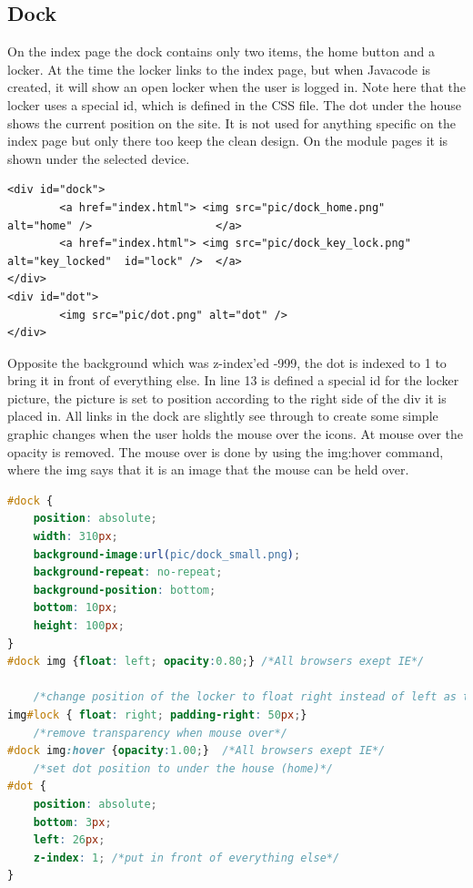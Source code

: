 \subsection{Dock}
On the index page the dock contains only two items, the home button and a locker. At the time the locker links to the index page, but when Javacode is created, it will show an open locker when the user is logged in. Note here that the locker uses a special id, which is defined in the CSS file. The dot under the house shows the current position on the site. It is not used for anything specific on the index page but only there too keep the clean design. On the module pages it is shown under the selected device.
\begin{lstlisting}
<div id="dock">
		<a href="index.html"> <img src="pic/dock_home.png" 		alt="home" /> 					</a>
		<a href="index.html"> <img src="pic/dock_key_lock.png" 	alt="key_locked"  id="lock" /> 	</a>
</div>
<div id="dot">
		<img src="pic/dot.png" alt="dot" />
</div>
\end{lstlisting}
Opposite the background which was z-index'ed -999, the dot is indexed to 1 to bring it in front of everything else. In line 13 is defined a special id for the locker picture, the picture is set to position according to the right side of the div it is placed in. All links in the dock are slightly see through to create some simple graphic changes when the user holds the mouse over the icons. At mouse over the opacity is removed. The mouse over is done by using the img:hover command, where the img says that it is an image that the mouse can be held over.
\begin{lstlisting}[language=CSS]
#dock {
	position: absolute;
	width: 310px;
	background-image:url(pic/dock_small.png);
	background-repeat: no-repeat;
	background-position: bottom;
	bottom: 10px;
	height: 100px;
}
#dock img {float: left; opacity:0.80;} /*All browsers exept IE*/

	/*change position of the locker to float right instead of left as the other link(s)*/
img#lock { float: right; padding-right: 50px;}
	/*remove transparency when mouse over*/
#dock img:hover {opacity:1.00;}  /*All browsers exept IE*/
	/*set dot position to under the house (home)*/
#dot {
	position: absolute;
	bottom: 3px;
	left: 26px;
	z-index: 1; /*put in front of everything else*/
}
\end{lstlisting}
